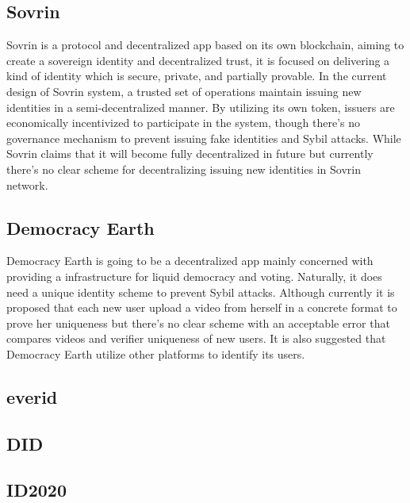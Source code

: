 \documentclass[conference]{IEEEtran}
\begin{document}
\subsection{Sovrin}

Sovrin is a protocol and decentralized app based on its own blockchain, aiming to create a sovereign identity and decentralized trust, it is focused on delivering a kind of identity which is secure, private, and partially provable. In the current design of Sovrin system, a trusted set of operations maintain issuing new identities in a semi-decentralized manner. By utilizing its own token, issuers are economically incentivized to participate in the system, though there’s no governance mechanism to prevent issuing fake identities and Sybil attacks. While Sovrin claims that it will become fully decentralized in future but currently there’s no clear scheme for decentralizing issuing new identities in Sovrin network. 

\subsection{Democracy Earth}
Democracy Earth is going to be a decentralized app mainly concerned with providing a infrastructure for liquid democracy and voting. Naturally, it does need a unique identity scheme to prevent Sybil attacks. Although currently it is proposed that each new user upload a video from herself in a concrete format to prove her uniqueness but there’s no clear scheme with an acceptable error that compares videos and verifier uniqueness of new users. It is also suggested that Democracy Earth utilize other platforms to identify its users.
\subsection{everid}
\subsection{ DID}
\subsection{ID2020}
\end{document}
